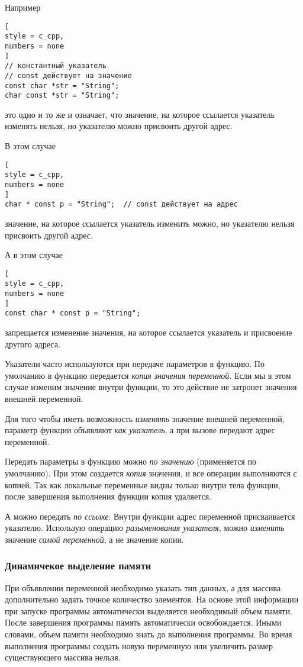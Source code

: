 \documentclass[%
	11pt,
	a4paper,
	utf8,
		]{article}
\begin{document}
Например
\begin{lstlisting}[
style = c_cpp,
numbers = none
]
// константный указатель
// const действует на значение
const char *str = "String";
char const *str = "String";
\end{lstlisting}
это одно и то же и означает, что значение, на которое ссылается указатель изменять нельзя, но указателю можно присвоить другой адрес.

В этом случае
\begin{lstlisting}[
style = c_cpp,
numbers = none
]
char * const p = "String";  // const действует на адрес
\end{lstlisting}
значение, на которое ссылается указатель изменить можно, но указателю нельзя присвоить другой адрес.

А в этом случае
\begin{lstlisting}[
style = c_cpp,
numbers = none
]
const char * const p = "String";
\end{lstlisting}
запрещается изменение значения, на которое ссылается указатель и присвоение другого адреса.

Указатели часто используются при передаче параметров в функцию. По умолчанию в функцию передается \emph{копия значения переменной}. Если мы в этом случае изменим значение внутри функции, то это действие не затронет значения внешней переменной.

Для того чтобы иметь возможность \emph{изменять} значение внешней переменной, параметр функции объявляют \emph{как указатель}, а при вызове передают адрес переменной.

Передать параметры в функцию можно \emph{по значению} (применяется по умолчанию). При этом создается \emph{копия} значения, и все операции выполняются с копией. Так как локальные переменные видны только внутри тела функции, после завершения выполнения функции копия удаляется. 

А можно передать \emph{по ссылке}. Внутри функции адрес переменной присваивается указателю. Использую операцию \emph{разыменования указателя}, можно \emph{изменить} значение \emph{самой переменной}, а не значение копии. 

\subsubsection{Динамичекое выделение памяти}

При объявлении переменной необходимо указать тип данных, а для массива дополнительно задать точное количество элементов. На основе этой информации при запуске программы автоматически выделяется необходимый объем памяти. После завершения программы память автоматически освобождается. Иными словами, объем памяти необходимо знать до выполнения программы. Во время выполнения программы создать новую переменную или увеличить размер существующего массива нельзя.
\end{document}
